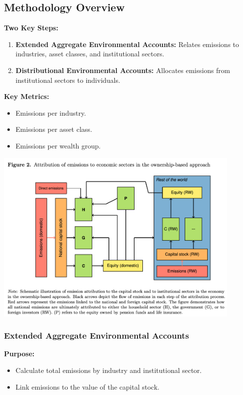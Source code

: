 \documentclass[10pt]{beamer}
\begin{document}
\subsection{Methodology Overview}
\begin{frame}{\subsecname}
    \textbf{Two Key Steps:}
    \begin{enumerate}
        \item \textbf{Extended Aggregate Environmental Accounts:} Relates emissions to industries, asset classes, and institutional sectors.
        \item \textbf{Distributional Environmental Accounts:} Allocates emissions from institutional sectors to individuals.
    \end{enumerate}
    \vspace{0.3cm}
    \textbf{Key Metrics:}
    \begin{itemize}
        \item Emissions per industry.
        \item Emissions per asset class.
        \item Emissions per wealth group.
    \end{itemize}
\end{frame}

\begin{frame}{\subsecname}
\begin{center}
    \includegraphics[width=0.9\textwidth]{../Figures/Figure_2.png}
\end{center}
\end{frame}

\subsubsection{Extended Aggregate Environmental Accounts}
\begin{frame}{\subsubsecname}
    \textbf{Purpose:}
    \begin{itemize}
        \item Calculate total emissions by industry and institutional sector.
        \item Link emissions to the value of the capital stock.
    \end{itemize}
\end{frame}
\end{document}
